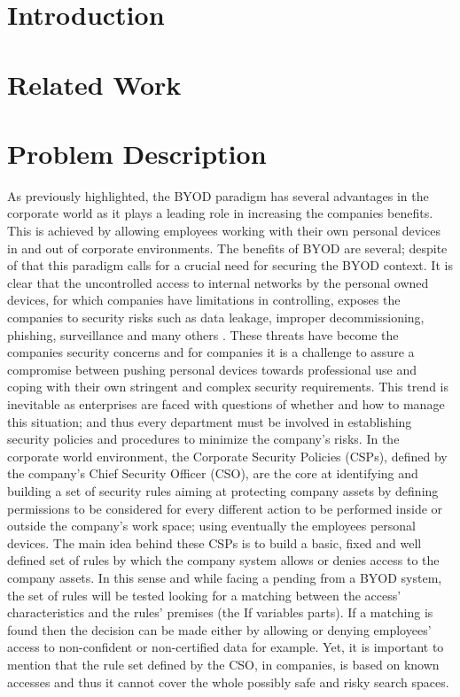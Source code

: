 \documentclass[runningheads,a4paper]{llncs}
\begin{document}
\section{Introduction}
\label{sec:intro}


\section{Related Work}
\label{sec:SotA}

\section{Problem Description}
\label{sec:problem}
As previously highlighted, the BYOD paradigm has several advantages in the corporate world as it plays a leading role in increasing the companies benefits. This is achieved by allowing employees working with their own personal devices in and out of corporate environments. The benefits of BYOD are several; despite of that this paradigm calls for a crucial need for securing the BYOD context. It is clear that the uncontrolled access to internal networks by the personal owned devices, for which companies have limitations in controlling, exposes the companies to security risks such as data leakage, improper decommissioning, phishing, surveillance and many others \cite{lennon2012changing}. These threats have become the companies security concerns and for companies it is a challenge to assure a compromise between pushing personal devices towards professional use and coping with their own stringent and complex security requirements. This trend is inevitable as enterprises are faced with questions of whether and how to manage this situation; and thus every department must be involved in establishing security policies and procedures to minimize the company's risks. In the corporate world environment, the Corporate Security Policies (CSPs), defined by the company's Chief Security Officer (CSO), are the core at identifying and building a set of security rules aiming at protecting company assets by defining permissions to be considered for every different action to be performed inside or outside the company's work space; using eventually the employees personal devices. The main idea behind these CSPs is to build a basic, fixed and well defined set of rules by which the company system allows or denies access to the company assets. In this sense and while facing a pending from a BYOD system, the set of rules will be tested looking for a matching between the access' characteristics and the rules' premises (the If variables parts). If a matching is found then the decision can be made either by allowing or denying employees' access to non-confident or non-certified data for example. Yet, it is important to mention that the rule set defined by the CSO, in companies, is based on known accesses and thus it cannot cover the whole possibly safe and risky search spaces.
\end{document}
